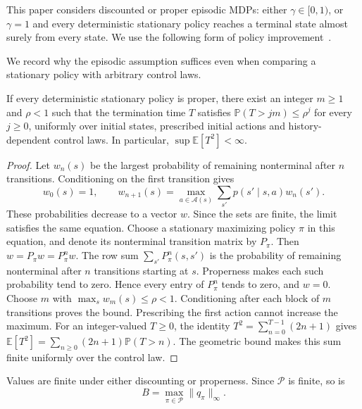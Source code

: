 This paper considers discounted or proper episodic MDPs: either $\gamma\in[0,1)$, or $\gamma=1$ and every deterministic stationary policy reaches a terminal state almost surely from every state. We use the following form of policy improvement~\citep{Howard1960DynamicProcesses}.

We record why the episodic assumption suffices even when comparing a stationary policy with arbitrary control laws.
\begin{lemma}\label{lem: uniform termination}
If every deterministic stationary policy is proper, there exist an integer $m\ge1$ and $\rho<1$ such that the termination time $T$ satisfies $\mathbb P(T>jm)\le\rho^j$ for every $j\ge0$, uniformly over initial states, prescribed initial actions and history-dependent control laws. In particular, $\sup\mathbb E[T^2]<\infty$.
\end{lemma}
\begin{proof}
Let $w_n(s)$ be the largest probability of remaining nonterminal after $n$ transitions. Conditioning on the first transition gives
\[
w_0(s)=1,\qquad w_{n+1}(s)=\max_{a\in\mathcal A(s)}\sum_{s'}p(s'\mid s,a)w_n(s').
\]
These probabilities decrease to a vector $w$. Since the sets are finite, the limit satisfies the same equation. Choose a stationary maximizing policy $\pi$ in this equation, and denote its nonterminal transition matrix by $P_\pi$. Then $w=P_\pi w=P_\pi^n w$. The row sum $\sum_{s'}P_\pi^n(s,s')$ is the probability of remaining nonterminal after $n$ transitions starting at $s$. Properness makes each such probability tend to zero. Hence every entry of $P_\pi^n$ tends to zero, and $w=0$. Choose $m$ with $\max_s w_m(s)\le\rho<1$. Conditioning after each block of $m$ transitions proves the bound. Prescribing the first action cannot increase the maximum. For an integer-valued $T\ge0$, the identity $T^2=\sum_{n=0}^{T-1}(2n+1)$ gives $\mathbb E[T^2]=\sum_{n\ge0}(2n+1)\mathbb P(T>n)$. The geometric bound makes this sum finite uniformly over the control law.
\end{proof}

Values are finite under either discounting or properness. Since $\mathcal P$ is finite, so is
\begin{equation}\label{eq: target bound}
B=\max_{\pi\in\mathcal P}\|q_\pi\|_\infty.
\end{equation}

